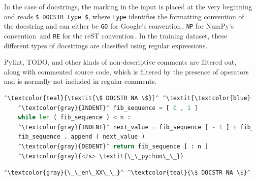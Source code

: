             
            In the case of docstrings, the marking in the input is placed at the very beginning and reads \texttt{\$ DOCSTR type \$}, where \texttt{type} identifies the formatting convention of the docstring and can either be \texttt{GO} for Google's convention\,\cite{GooglePythonStyleGuide}, \texttt{NP} for NumPy's convention\,\cite{NumPyStyleGuide} and \texttt{RE} for the reST convention\,\cite{SphinxPythonDomains}. In the training dataset, these different types of docstrings are classified using regular expressions.
            
            Pylint, TODO, and other kinds of non-descriptive comments are filtered out, along with commented source code, which is filtered by the presence of operators and is normally not included in regular comments.
            
            \medskip
            \begin{minipage}{.45\textwidth}
                \begin{lstlisting}[language=Python, caption={Code in listing \ref{lst:comment} formatted as an input for comment generation to predict the docstring. Italics denote global attention. \\ Note that the code has been ran through the PLBART's preprocessor function, which introduced \texttt{INDENT} and \texttt{DEDENT} tokens, as well as added spacing between tokens.}]
    ^\textcolor{teal}{\textit{\$ DOCSTR NA \$}}^ ^\textit{\textcolor{blue}{def} fibonacci ( n ) :}^
    ^\textcolor{gray}{INDENT}^ fib_sequence = [ 0 , 1 ]
    while len ( fib_sequence ) < n :
    ^\textcolor{gray}{INDENT}^ next_value = fib_sequence [ - 1 ] + fib_sequence [ - 2 ]
    fib_sequence . append ( next_value )
    ^\textcolor{gray}{DEDENT}^ return fib_sequence [ : n ]
    ^\textcolor{gray}{</s> \textit{\_\_python\_\_}}
                \end{lstlisting}
            \end{minipage}
            \hfill
            \begin{minipage}{.45\textwidth}
                \begin{lstlisting}[language=Python, caption={Code in listing \ref{lst:comment} formatted as a label.}]
    ^\textcolor{gray}{\_\_en\_XX\_\_}^ ^\textcolor{teal}{\$ DOCSTR NA \$}^ Calculates the fibonacci sequence of length . ^\textcolor{gray}{</s>}^
                \end{lstlisting}
            \end{minipage}
    
